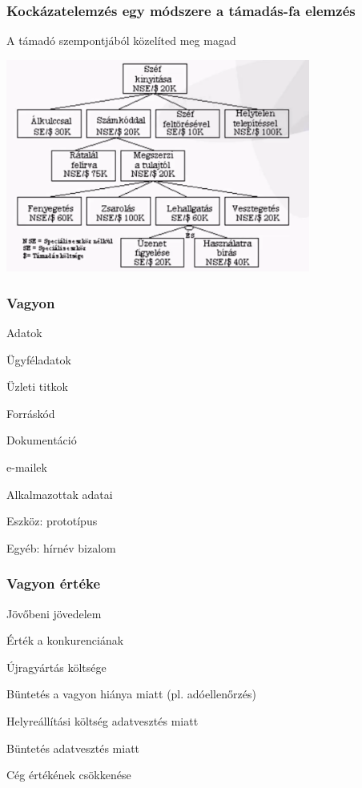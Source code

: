 \documentclass[a4paper,14pt, twocolumn]{extarticle}
\begin{document}
			\subsubsection{Kockázatelemzés egy módszere a támadás-fa elemzés} 
				\begin{compactitem}
					\item A  támadó szempontjából közelíted meg magad
					\begin{center}
						\includegraphics[width=10cm]{tamadasfa}
					\end{center}
				\end{compactitem}
			\subsubsection{Vagyon}
				\begin{compactitem}
					\item Adatok
					{ 
						\begin{compactitem}
							\item Ügyféladatok
							\item Üzleti titkok 
							\item Forráskód
							\item Dokumentáció
							\item e-mailek
							\item Alkalmazottak adatai
						\end{compactitem}
					}
					\item Eszköz: prototípus
					\item Egyéb: hírnév bizalom
				\end{compactitem}		
			\subsubsection{Vagyon értéke}
				\begin{compactitem}
					\item Jövőbeni jövedelem 
					\item Érték a konkurenciának 
					\item Újragyártás költsége 
					\item Büntetés a vagyon hiánya miatt (pl. adóellenőrzés) 
					\item Helyreállítási költség adatvesztés miatt 
					\item Büntetés adatvesztés miatt 
					\item Cég értékének csökkenése 
				\end{compactitem}
\end{document}
